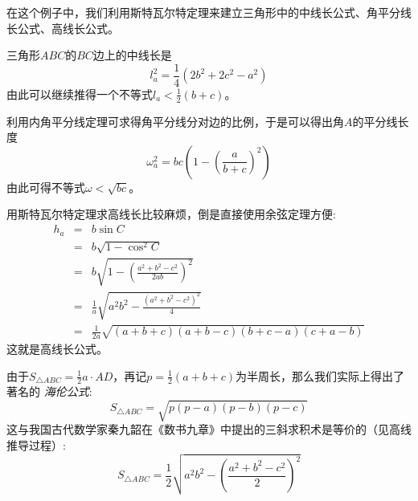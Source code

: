 \begin{example}
  在这个例子中，我们利用斯特瓦尔特定理来建立三角形中的中线长公式、角平分线长公式、高线长公式。

  三角形$ABC$的$BC$边上的中线长是
  \begin{equation}
    \label{eq:midline-length-triangle}
    l_{a}^2 = \frac{1}{4}(2b^2+2c^2-a^2)
  \end{equation}
  由此可以继续推得一个不等式$l_a < \frac{1}{2}(b+c)$。

  利用内角平分线定理可求得角平分线分对边的比例，于是可以得出角$A$的平分线长度
  \begin{equation}
    \label{eq:bisec-angle-length-triangle}
    \omega_a^2 = bc \left( 1 - \left( \frac{a}{b+c} \right)^2 \right)
  \end{equation}
  由此可得不等式$\omega < \sqrt{bc}$。

  用斯特瓦尔特定理求高线长比较麻烦，倒是直接使用余弦定理方便:
  \begin{eqnarray*}
    h_a & = & b \sin{C} \\
       & = & b \sqrt{1-\cos^2{C}} \\
       & = & b \sqrt{1-\left( \frac{a^2+b^2-c^2}{2ab} \right)^2} \\
    & = & \frac{1}{a} \sqrt{a^2b^2-\frac{(a^2+b^2-c^2)^2}{4}} \\
    & = & \frac{1}{2a} \sqrt{(a+b+c)(a+b-c)(b+c-a)(c+a-b)}
  \end{eqnarray*}
  这就是高线长公式。

  由于$S_{\triangle ABC} = \frac{1}{2} a \cdot AD$，再记$p=\frac{1}{2}(a+b+c)$为半周长，那么我们实际上得出了著名的 \emph{海伦公式}:
  \begin{equation}
    \label{eq:helen-area-triangle}
    S_{\triangle ABC} = \sqrt{p(p-a)(p-b)(p-c)}
  \end{equation}
  这与我国古代数学家秦九韶在《数书九章》中提出的三斜求积术是等价的（见高线推导过程）:
  \begin{equation}
    \label{eq:three-inclined-quadrature-operation}
    S_{\triangle ABC} = \frac{1}{2} \sqrt{a^2b^2- \left( \frac{a^2+b^2-c^2}{2} \right)^2}
  \end{equation}
\end{example}


